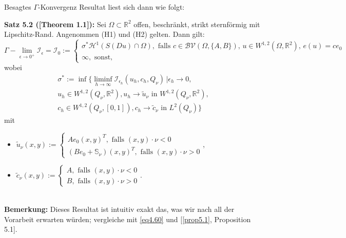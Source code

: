 Besagtes \(\Gamma\)-Konvergenz Resultat liest sich dann wie folgt:\\[0.5cm]
\colorbox{generalYellow}{\begin{minipage}{16cm}{\textcolor{black}{}{\label{theo5.2}}}
\textbf{Satz 5.2 (\cite{Stinson_2021}[Theorem 1.1]):} Sei \(\Omega \subset \mathbb{R}^2\) offen, beschränkt, strikt sternförmig mit Lipschitz-Rand. Angenommen (H1) und (H2) gelten. Dann gilt:
\begin{equation}
    \Gamma-\lim_{\epsilon \to 0^+} \mathcal{I}_{\epsilon} = \mathcal{I}_0 := \begin{cases}
        \sigma^* \mathcal{H}^{1} (S(Du) \cap \Omega), \text{ falls }c \in \mathcal{BV}(\Omega,\{A,B\}), \, u \in W^{1,2}(\Omega,\mathbb{R}^2), \, e(u) = c e_0 \\
        \infty, \text{ sonst,}
    \end{cases}
\end{equation}
wobei
\begin{equation}
\begin{array}{l}
    \sigma^* := \inf \{\liminf_{h \to \infty} \mathcal{I}_{\epsilon_h} (u_h,c_h,Q_{\nu}) \, | \epsilon_h \to 0, \\
    u_h \in W^{1,2}(Q_{\nu},\mathbb{R}^2), u_h \to \tilde{u}_{\nu} \text{ in }W^{1,2}(Q_{\nu},\mathbb{R}^2), \\
    c_h \in W^{1,2}(Q_{\nu},[0,1]), c_h \to \tilde{c}_{\nu} \text{ in }L^2(Q_{\nu})\}
\end{array}
\end{equation}
mit
\begin{itemize}
    \item \(\tilde{u}_{\nu}(x,y) := \begin{cases}
        Ae_0(x,y)^T, \text{ falls }(x,y) \cdot \nu < 0 \\
        (Be_0 + \mathbb{S}_{\nu})(x,y)^T, \text{ falls }(x,y) \cdot \nu > 0
    \end{cases}\),
    \item \(\tilde{c}_{\nu}(x,y) := \begin{cases}
        A, \text{ falls }(x,y) \cdot \nu < 0 \\
        B, \text{ falls }(x,y) \cdot \nu > 0
    \end{cases}\).
\end{itemize}
\end{minipage}}\\

\textbf{Bemerkung:} Dieses Resultat ist intuitiv exakt das, was wir nach all der Vorarbeit erwarten würden; vergleiche mit \eqref{eq4.60} und [\ref{prop5.1}, Proposition 5.1].\\

